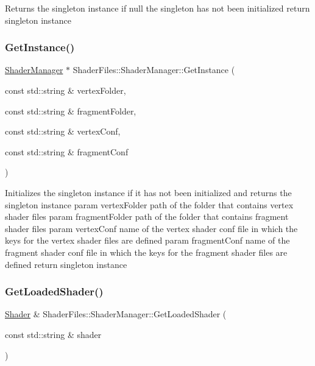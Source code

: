 Returns the singleton instance if null the singleton has not been initialized return singleton instance \mbox{\label{class_shader_files_1_1_shader_manager_a805da1d794532dd7dbc148795ec54d28}} 
\subsubsection{\texorpdfstring{GetInstance()}{GetInstance()}}
{\footnotesize\ttfamily \mbox{\hyperlink{class_shader_files_1_1_shader_manager}{Shader\+Manager}} $\ast$ Shader\+Files\+::\+Shader\+Manager\+::\+Get\+Instance (\begin{DoxyParamCaption}\item[{const std\+::string \&}]{vertex\+Folder,  }\item[{const std\+::string \&}]{fragment\+Folder,  }\item[{const std\+::string \&}]{vertex\+Conf,  }\item[{const std\+::string \&}]{fragment\+Conf }\end{DoxyParamCaption})\hspace{0.3cm}{\ttfamily [static]}}

Initializes the singleton instance if it has not been initialized and returns the singleton instance param vertex\+Folder path of the folder that contains vertex shader files param fragment\+Folder path of the folder that contains fragment shader files param vertex\+Conf name of the vertex shader conf file in which the keys for the vertex shader files are defined param fragment\+Conf name of the fragment shader conf file in which the keys for the fragment shader files are defined return singleton instance \mbox{\label{class_shader_files_1_1_shader_manager_a96cd9397c9e932cd69fac3ce4363dabe}} 
\subsubsection{\texorpdfstring{GetLoadedShader()}{GetLoadedShader()}}
{\footnotesize\ttfamily \mbox{\hyperlink{class_shader_files_1_1_shader}{Shader}} \& Shader\+Files\+::\+Shader\+Manager\+::\+Get\+Loaded\+Shader (\begin{DoxyParamCaption}\item[{const std\+::string \&}]{shader }\end{DoxyParamCaption})}

